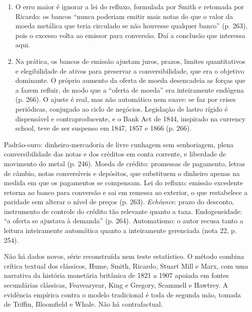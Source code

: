 \begin{enumerate}[leftmargin=*,nosep]
\item O erro maior é ignorar a lei do refluxo, formulada por Smith e retomada por
Ricardo: os bancos ``nunca poderiam emitir mais notas do que o valor da moeda
metálica que teria circulado se não houvesse qualquer banco'' (p. 263), pois o
excesso volta ao emissor para conversão. Daí a conclusão que interessa aqui.


\item Na prática, os bancos de emissão ajustam juros, prazos, limites
quantitativos e elegibilidade de ativos para preservar a conversibilidade, que
era o objetivo dominante. O próprio aumento da oferta de moeda desencadeia as
forças que a fazem refluir, de modo que a ``oferta de moeda'' era inteiramente
endógena (p. 266). O ajuste é real, mas não automático nem suave: se faz por
crises periódicas, conjugado ao ciclo de negócios. Legislação de lastro rígido é
dispensável e contraproducente, e o Bank Act de 1844, inspirado na currency
school, teve de ser suspenso em 1847, 1857 e 1866 (p. 266).
\end{enumerate}


Padrão-ouro: dinheiro-mercadoria de livre cunhagem sem senhoriagem, plena
conversibilidade das notas e dos créditos em conta corrente, e liberdade de
movimento do metal (p. 246). Moeda de crédito: promessas de pagamento, letras de
câmbio, notas conversíveis e depósitos, que substituem o dinheiro apenas na
medida em que os pagamentos se compensam. Lei do refluxo: emissão excedente
retorna ao banco para conversão e sai em remessa ao exterior, o que restabelece a
paridade sem alterar o nível de preços (p. 263). \emph{Echéance}: prazo do
desconto, instrumento de controle do crédito tão relevante quanto a taxa.
Endogeneidade: ``a oferta se ajustava à demanda'' (p. 264). Automatismo: o autor
recusa tanto a leitura inteiramente automática quanto a inteiramente gerenciada
(nota 22, p. 254).

Não há dados novos, série reconstruída nem teste estatístico. O método combina
crítica textual dos clássicos, Hume, Smith, Ricardo, Stuart Mill e Marx, com uma
narrativa da história monetária britânica de 1821 a 1907 apoiada em fontes
secundárias clássicas, Feavearyear, King e Gregory, Scammell e Hawtrey. A
evidência empírica contra o modelo tradicional é toda de segunda mão, tomada de
Triffin, Bloomfield e Whale. Não há contrafactual.

